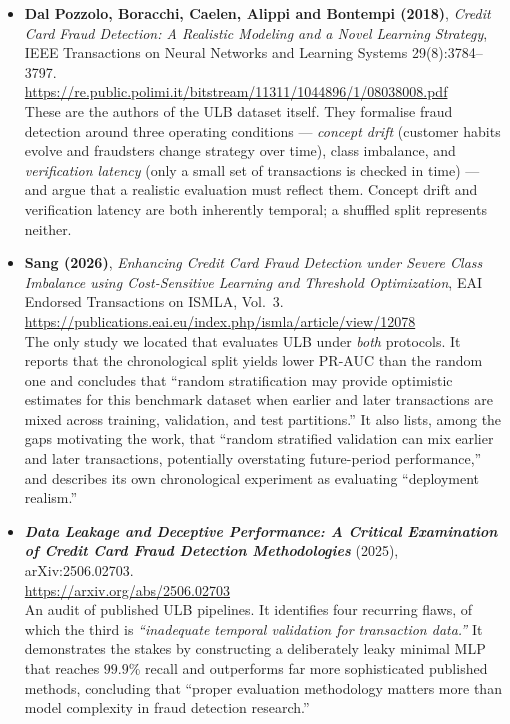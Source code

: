 \documentclass[11pt,a4paper]{article}
\begin{document}
\begin{itemize}[itemsep=4pt]
      \item \textbf{Dal Pozzolo, Boracchi, Caelen, Alippi and Bontempi (2018)}, \emph{Credit Card
            Fraud Detection: A Realistic Modeling and a Novel Learning Strategy}, IEEE
            Transactions on Neural Networks and Learning Systems 29(8):3784--3797. \\
            \small\url{https://re.public.polimi.it/bitstream/11311/1044896/1/08038008.pdf}\\
            \normalsize These are the authors of the ULB dataset itself. They formalise fraud
            detection around three operating conditions --- \emph{concept drift} (customer habits
            evolve and fraudsters change strategy over time), class imbalance, and
            \emph{verification latency} (only a small set of transactions is checked in time) ---
            and argue that a realistic evaluation must reflect them. Concept drift and
            verification latency are both inherently temporal; a shuffled split represents
            neither.

      \item \textbf{Sang (2026)}, \emph{Enhancing Credit Card Fraud Detection under Severe Class
            Imbalance using Cost-Sensitive Learning and Threshold Optimization}, EAI Endorsed
            Transactions on ISMLA, Vol.~3. \\
            \small\url{https://publications.eai.eu/index.php/ismla/article/view/12078}\\
            \normalsize The only study we located that evaluates ULB under \emph{both} protocols.
            It reports that the chronological split yields lower PR-AUC than the random one and
            concludes that ``random stratification may provide optimistic estimates for this
            benchmark dataset when earlier and later transactions are mixed across training,
            validation, and test partitions.'' It also lists, among the gaps motivating the work,
            that ``random stratified validation can mix earlier and later transactions,
            potentially overstating future-period performance,'' and describes its own
            chronological experiment as evaluating ``deployment realism.''

      \item \textbf{\emph{Data Leakage and Deceptive Performance: A Critical Examination of
            Credit Card Fraud Detection Methodologies}} (2025), arXiv:2506.02703. \\
            \small\url{https://arxiv.org/abs/2506.02703}\\
            \normalsize An audit of published ULB pipelines. It identifies four recurring flaws,
            of which the third is \emph{``inadequate temporal validation for transaction
            data.''} It demonstrates the stakes by constructing a deliberately leaky minimal MLP
            that reaches $99.9\%$ recall and outperforms far more sophisticated published
            methods, concluding that ``proper evaluation methodology matters more than model
            complexity in fraud detection research.''


\end{itemize}
\end{document}
